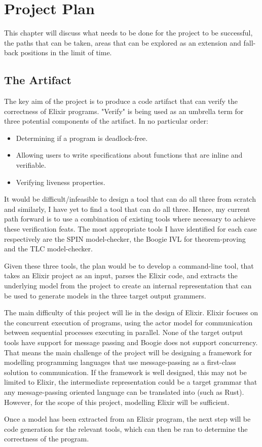 \chapter{Project Plan}
This chapter will discuss what needs to be done for the project to be successful, the paths that can be taken, areas that can be explored as an extension and fall-back positions in the limit of time.
\par
\section{The Artifact}
The key aim of the project is to produce a code artifact that can verify the correctness of Elixir programs. "Verify" is being used as an umbrella term for three potential components of the artifact. In no particular order:
\begin{itemize}
    \item Determining if a program is deadlock-free.
    \item Allowing users to write specifications about functions that are inline and verifiable.
    \item Verifying liveness properties. 
\end{itemize}
It would be difficult/infeasible to design a tool that can do all three from scratch and similarly, I have yet to find a tool that can do all three. Hence, my current path forward is to use a combination of existing tools where necessary to achieve these verification feats. The most appropriate tools I have identified for each case respectively are the SPIN model-checker, the Boogie IVL for theorem-proving and the TLC model-checker.
\par
Given these three tools, the plan would be to develop a command-line tool, that takes an Elixir project as an input, parses the Elixir code, and extracts the underlying model from the project to create an internal representation that can be used to generate models in the three target output grammers.
\par
The main difficulty of this project will lie in the design of Elixir. Elixir focuses on the concurrent execution of programs, using the actor model for communication between sequential processes executing in parallel. None of the target output tools have support for message passing and Boogie does not support concurrency. That means the main challenge of the project will be designing a framework for modelling programming languages that use message-passing as a first-class solution to communication. If the framework is well designed, this may not be limited to Elixir, the intermediate representation could be a target grammar that any message-passing oriented language can be translated into (such as Rust). However, for the scope of this project, modelling Elixir will be sufficient.
\par
Once a model has been extracted from an Elixir program, the next step will be code generation for the relevant tools, which can then be ran to determine the correctness of the program.
